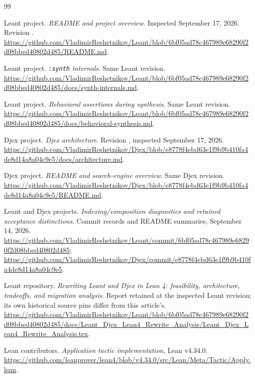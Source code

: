 \clearpage
\begin{thebibliography}{99}

Leant project. \emph{README and project overview}.
Inspected September 17, 2026.\\
Revision .
\url{https://github.com/VladimirReshetnikov/Leant/blob/6bf05ad78c467989e68290f2d08bbed40802d485/README.md}.

Leant project. \emph{\texttt{:synth} internals}.
Same Leant revision.
\url{https://github.com/VladimirReshetnikov/Leant/blob/6bf05ad78c467989e68290f2d08bbed40802d485/docs/synth-internals.md}.

Leant project. \emph{Behavioral assertions during synthesis}.
Same Leant revision.
\url{https://github.com/VladimirReshetnikov/Leant/blob/6bf05ad78c467989e68290f2d08bbed40802d485/docs/behavioral-synthesis.md}.

Djex project. \emph{Djex architecture}.
Revision , inspected September 17, 2026.
\url{https://github.com/VladimirReshetnikov/Djex/blob/e8778f4ebd63e1f9b9b410fa4de8d14a8a04c9e5/docs/architecture.md}.

Djex project. \emph{README and search-engine overview}.
Same Djex revision.
\url{https://github.com/VladimirReshetnikov/Djex/blob/e8778f4ebd63e1f9b9b410fa4de8d14a8a04c9e5/README.md}.

Leant and Djex projects. \emph{Indexing/composition diagnostics and retained acceptance distinctions}.
Commit records and README summaries, September 14, 2026.
\url{https://github.com/VladimirReshetnikov/Leant/commit/6bf05ad78c467989e68290f2d08bbed40802d485};
\url{https://github.com/VladimirReshetnikov/Djex/commit/e8778f4ebd63e1f9b9b410fa4de8d14a8a04c9e5}.

Leant repository. \emph{Rewriting Leant and Djex in Lean 4: feasibility, architecture, tradeoffs, and migration analysis}.
Report retained at the inspected Leant revision; its own historical source pins differ from this article's.
\url{https://github.com/VladimirReshetnikov/Leant/blob/6bf05ad78c467989e68290f2d08bbed40802d485/docs/Leant_Djex_Lean4_Rewrite_Analysis/Leant_Djex_Lean4_Rewrite_Analysis.tex}.

Lean contributors. \emph{Application tactic implementation}, Lean v4.34.0.
\url{https://github.com/leanprover/lean4/blob/v4.34.0/src/Lean/Meta/Tactic/Apply.lean}.


\end{thebibliography}
